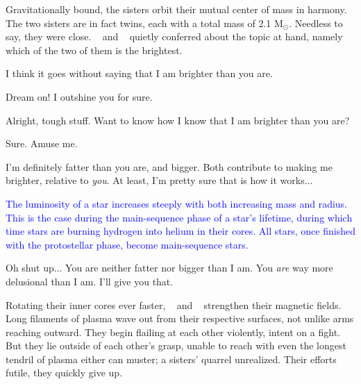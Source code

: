\documentclass[main.tex]{subfiles}
\begin{document}
\par \nar Gravitationally bound, the sisters orbit their mutual center of mass in harmony.  The two sisters are in fact twins, each with a total mass of 2.1 M$_{\odot}$.  Needless to say, they were close.  \rmtaygete~ and \rmalcyone~ quietly conferred about the topic at hand, namely which of the two of them is the brightest.


\par \Taygete I think it goes without saying that I am brighter than you are.

\par \Alcyone Dream on!  I outshine you for sure.

\par \Taygete Alright, tough stuff.  Want to know how I know that I am brighter than you are?

\par \Alcyone Sure.  Amuse me.

\par \Taygete I'm definitely fatter than you are, and bigger.  Both contribute to making me brighter, relative to \textit{you}.  At least, I'm pretty sure that is how it works...  

\begin{tcolorbox}[sharp corners, colback=blue!30, colframe=blue!80!blue, title=Dependence of Luminosity on Mass and Radius]
\par \textcolor{blue} {The luminosity of a star increases steeply with both increasing mass and radius.  This is the case during the main-sequence phase of a star's lifetime, during which time stars are burning hydrogen into helium in their cores.  All stars, once finished with the protostellar phase, become main-sequence stars.}
\end{tcolorbox}

\par \Alcyone Oh shut up...  You are neither fatter nor bigger than I am.  You \textit{are} way more delusional than I am.  I'll give you that.

\par \nar Rotating their inner cores ever faster, \rmtaygete~ and \rmalcyone~ strengthen their magnetic fields.  Long filaments of plasma wave out from their respective surfaces, not unlike arms reaching outward.  They begin flailing at each other violently, intent on a fight.  But they lie outside of each other's grasp, unable to reach with even the longest tendril of plasma either can muster; a sisters' quarrel unrealized.  Their efforts futile, they quickly give up.  
\end{document}
